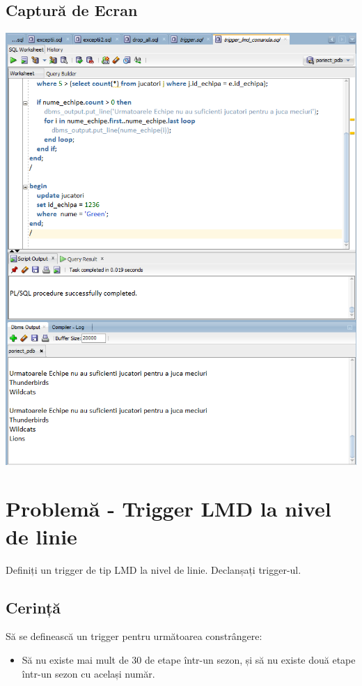 \documentclass{article}
\begin{document}
\subsection{Captură de Ecran}
\includegraphics[width=40em, keepaspectratio]{trigger_lmd_comanda}
\pagebreak

\section{Problemă - Trigger LMD la nivel de linie}
	Definiți un trigger de tip LMD la nivel de linie. Declanșați trigger-ul.
\subsection{Cerință}
Să se definească un trigger pentru următoarea constrângere:
\begin{itemize}
	\item Să nu existe mai mult de 30 de etape într-un sezon, și să nu existe două etape într-un sezon cu același număr.
\end{itemize}
\end{document}
